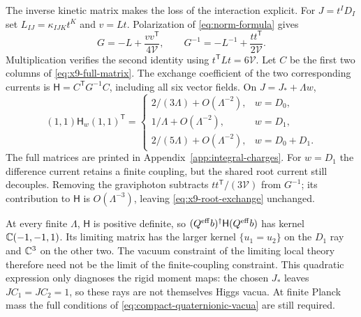 The inverse kinetic matrix makes the loss of the interaction explicit.
For $J=t^ID_I$ set $L_{IJ}=\kappa_{IJK}t^K$ and $v=Lt$.
Polarization of \eqref{eq:norm-formula} gives
\begin{equation}
 G=-L+\frac{vv^{\mathsf T}}{4\mathcal V},\qquad
 G^{-1}=-L^{-1}+\frac{tt^{\mathsf T}}{2\mathcal V}.
 \label{eq:x9-full-inverse}
\end{equation}
Multiplication verifies the second identity using
$t^{\mathsf T}Lt=6\mathcal V$. Let $C$ be the first two columns
of \eqref{eq:x9-full-matrix}. The exchange coefficient of the
two corresponding currents is $\mathsf H=C^{\mathsf T}G^{-1}C$,
including all six vector fields. On $J=J_*+\Lambda w$,
\begin{equation}
 (1,1)\mathsf H_w(1,1)^{\mathsf T}
 =\begin{cases}
  2/(3\Lambda)+O(\Lambda^{-2}),&w=D_0,\\
  1/\Lambda+O(\Lambda^{-2}),&w=D_1,\\
  2/(5\Lambda)+O(\Lambda^{-2}),&w=D_0+D_1.
 \end{cases}
 \label{eq:x9-root-exchange}
\end{equation}
The full matrices are printed in Appendix~\ref{app:integral-charges}.
For $w=D_1$ the difference current retains a finite coupling,
but the shared root current still decouples. Removing the graviphoton
subtracts $tt^{\mathsf T}/(3\mathcal V)$ from $G^{-1}$; its
contribution to $\mathsf H$ is $O(\Lambda^{-3})$, leaving
\eqref{eq:x9-root-exchange} unchanged.

At every finite $\Lambda$, $\mathsf H$ is positive definite, so
$(Q^{\rm eff}b)^\dagger\mathsf H(Q^{\rm eff}b)$ has kernel
$\mathbb C(-1,-1,1)$. Its limiting matrix has the larger kernel
$\{u_1=u_2\}$ on the $D_1$ ray and $\mathbb C^3$ on the other two.
The vacuum constraint of the limiting local theory therefore need
not be the limit of the finite-coupling constraint. This quadratic
expression only diagnoses the rigid moment maps: the chosen $J_*$
leaves $JC_1=JC_2=1$, so these rays are not themselves Higgs vacua.
At finite Planck mass the full conditions of
\eqref{eq:compact-quaternionic-vacua} are still required.
